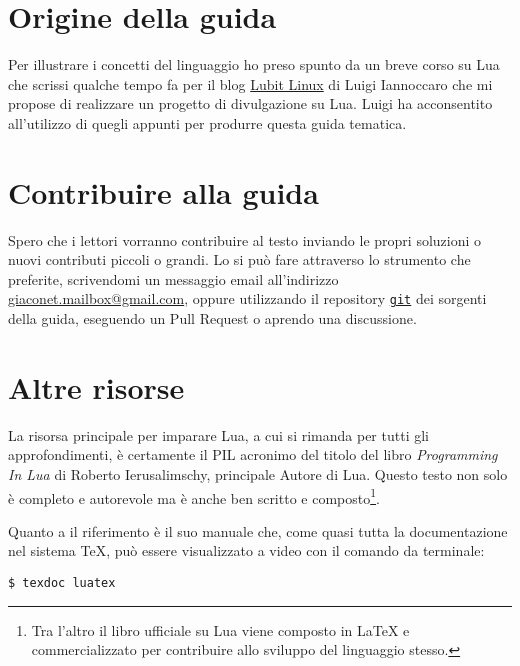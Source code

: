 \section{Origine della guida}

Per illustrare i concetti del linguaggio ho preso spunto da un breve corso su
Lua che scrissi qualche tempo fa per il blog
\href{http://parliamodi-ubuntu.blogspot.it}{Lubit Linux} di Luigi Iannoccaro
che mi propose di realizzare un progetto di divulgazione su Lua. Luigi ha
acconsentito all'utilizzo di quegli appunti per produrre questa guida tematica.


\section{Contribuire alla guida}

Spero che i lettori vorranno contribuire al testo inviando le propri soluzioni o
nuovi contributi piccoli o grandi. Lo si può fare attraverso lo strumento che
preferite, scrivendomi un messaggio email all'indirizzo
\href{mailto:giaconet.mailbox@gmail.com}{giaconet.mailbox@gmail.com}, oppure
utilizzando il repository
\href{https://github.com/GuITeX/guidalua}{\texttt{git}} dei sorgenti della
guida, eseguendo un Pull Request o aprendo una discussione.


\section{Altre risorse}

La risorsa principale per imparare Lua, a cui si rimanda per tutti gli
approfondimenti, è certamente il PIL acronimo del titolo del libro
\emph{Programming In Lua} di Roberto Ierusalimschy, principale Autore
di Lua. Questo testo non solo è completo e autorevole ma è anche ben scritto e
composto\footnote{Tra l'altro il libro ufficiale su Lua viene composto in
\LaTeX{} e commercializzato per contribuire allo sviluppo del linguaggio
stesso.}.

Quanto a \LuaTeX{} il riferimento è il suo manuale che, come quasi tutta la
documentazione nel sistema \TeX{}, può essere visualizzato a video con il
comando da terminale:
\begin{Verbatim}
$ texdoc luatex
\end{Verbatim}

